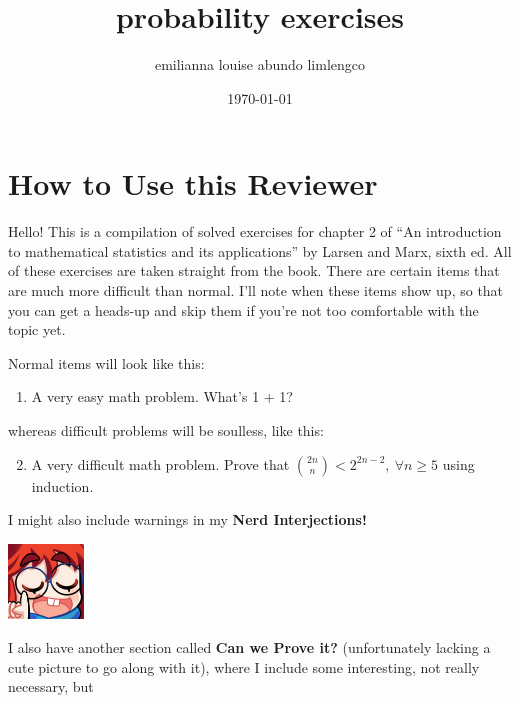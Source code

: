 \documentclass{article}
\title{probability exercises}
\author{emilianna louise abundo limlengco}
\date{\today}
\begin{document}
 

\section*{How to Use this Reviewer}
Hello! This is a compilation of solved exercises for chapter 2 of ``An introduction to mathematical statistics and its applications'' by Larsen and Marx, sixth ed. All of these exercises are taken straight from the book. 
There are certain items that are much more difficult than normal. I'll note when these items show up, so that you can get a heads-up and skip them if you're not too comfortable with the topic yet.\par 
Normal items will look like this:\begin{enumerate} 
    \item A very easy math problem. What's 1 + 1?
\end{enumerate} 
whereas difficult problems will be soulless, like this:\begin{enumerate}\setcounter{enumi}{1}
    \renewcommand{\labelenumi}{\fcolorbox{magenta}{white}{\textbf{\arabic{enumi}}}}
    \item A very difficult math problem. Prove that $\displaystyle \binom{2n}{n} < 2^{2n-2},~\forall n \geq 5$ using induction. 
\end{enumerate} I might also include warnings in my \textbf{Nerd Interjections!}\par
\parindent=25pt \begin{minipage}[t]{.14\textwidth}
    \vspace{0pt}
    \includegraphics[width=2cm]{nerd_maddy.png} 
\end{minipage}%
\parindent=0pt \par I also have another section called \textbf{Can we Prove it?} (unfortunately lacking a cute picture to go along with it), where I include some interesting, not really necessary, but 
\end{document}
